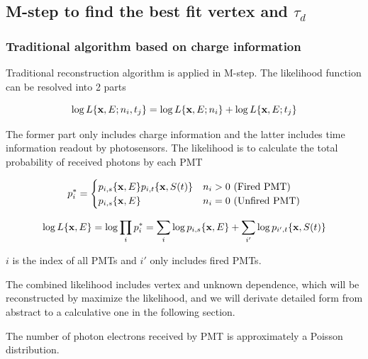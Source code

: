 \documentclass{article}
\begin{document}
\subsection{M-step to find the best fit vertex and $\tau_d$}
	
\subsubsection{Traditional algorithm based on charge information}

	\par Traditional reconstruction algorithm is applied in M-step. The likelihood function can be resolved into 2 parts
	
	\begin{equation}
		\numberwithin{equation}{section}
		\log L\{\textbf{x},E;n_i,t_j\} = \log L\{\textbf{x},E;n_i\}+\log L\{\textbf{x},E;t_j\}
	\end{equation}
	
	\par  The former part only includes charge information and the latter includes time information readout by photosensors. The likelihood is to calculate the total probability of received photons by each PMT 

	\begin{equation}
	\numberwithin{equation}{section}
	p^*_i =  
		\begin{cases}
 		p_{i,s}\{${\textbf x}$,E\} p_{i,t}\{${\textbf x}$,S(t)\}& \text{$n_i > 0$ (Fired PMT)}\\
 		p_{i,s}\{${\textbf x}$,E\} & \text{$n_i=0$ (Unfired PMT)}
		\end{cases}
	\end{equation}
	
	\begin{equation}
		\numberwithin{equation}{section}
		\log L\{\textbf{x},E\} = \log \prod_{i} p^*_i = 	\sum_{i}\log p_{i,s}\{\textbf{x},E\} +\sum_{i'}\log p_{i',t}\{\textbf{x},S(t)\} 
	\end{equation}
	
	\par $i$ is the index of all PMTs and $i'$ only includes fired PMTs.   
	\par The combined likelihood includes vertex and unknown dependence, which will be reconstructed by maximize the likelihood, and we will derivate detailed form from abstract to a calculative one in the following section.


\par The number of photon electrons received by PMT is approximately a Poisson distribution.
	
\end{document}
